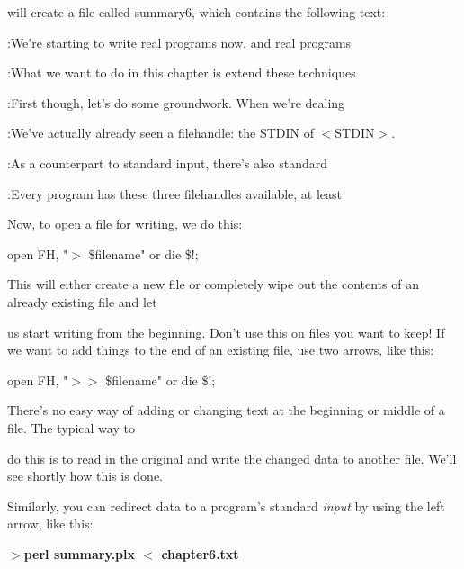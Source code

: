 \documentclass[a4paper,11pt]{book}
\begin{document}
\noindent 

\noindent will create a file called summary6, which contains the following text:

\noindent 

:We're starting to write real programs now, and real programs

:What we want to do in this chapter is extend these techniques

:First though, let's do some groundwork. When we're dealing

:We've actually already seen a filehandle: the STDIN of $<$STDIN$>$.

:As a counterpart to standard input, there's also standard

:Every program has these three filehandles available, at least

\noindent 

\noindent 

\noindent Now, to open a file for writing, we do this:

\noindent 

\noindent open FH, "$>$ \$filename" or die \$!;

\noindent 

\noindent This will either create a new file or completely wipe out the contents of an already existing file and let

\noindent us start writing from the beginning. Don't use this on files you want to keep! If we want to add things to the end of an existing file, use two arrows, like this:

\noindent 

\noindent open FH, "$>$$>$ \$filename" or die \$!;

\noindent 

\noindent There's no easy way of adding or changing text at the beginning or middle of a file. The typical way to

\noindent do this is to read in the original and write the changed data to another file. We'll see shortly how this is done.

\noindent 

\noindent Similarly, you can redirect data to a program's standard \textit{input }by using the left arrow, like this:

\noindent 

\noindent $>$\textbf{perl summary.plx $<$ chapter6.txt}

\noindent 
\end{document}
